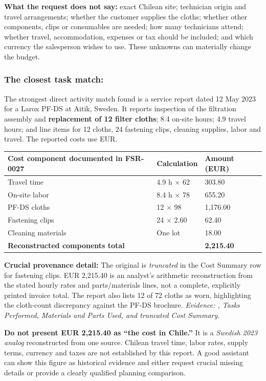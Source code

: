 \documentclass[11pt,a4paper]{article}
\DeclareRobustCommand{\code}[1]{{\ttfamily\small\detokenize{#1}}}
\newcommand{\source}[1]{{\footnotesize\color{Gray}\textit{Evidence: #1}}}
\newcommand{\term}[1]{\textbf{#1}}
\begin{document}
\textbf{What the request does not say:} exact Chilean site; technician origin and travel arrangements; whether the customer supplies the cloths; whether other components, clips or consumables are needed; how many technicians attend; whether travel, accommodation, expenses or tax should be included; and which currency the salesperson wishes to use. These unknowns can materially change the budget.

\subsubsection{The closest task match: \code{FSR-0027.txt}}
The strongest direct activity match found is a service report dated 12 May 2023 for a Larox PF-DS at Aitik, Sweden. It reports inspection of the filtration assembly and \term{replacement of 12 filter cloths}; 8.4 on-site hours; 4.9 travel hours; and line items for 12 cloths, 24 fastening clips, cleaning supplies, labor and travel. The reported costs use EUR.

\begin{tabularx}{\textwidth}{@{}Y L{28mm}L{32mm}@{}}
\toprule\textbf{Cost component documented in FSR-0027} & \textbf{Calculation} & \textbf{Amount (EUR)}\\\midrule
Travel time & 4.9 h $\times$ 62 & 303.80\\
On-site labor & 8.4 h $\times$ 78 & 655.20\\
PF-DS cloths & 12 $\times$ 98 & 1,176.00\\
Fastening clips & 24 $\times$ 2.60 & 62.40\\
Cleaning materials & One lot & 18.00\\\midrule
\textbf{Reconstructed components total} & & \textbf{2,215.40}\\\bottomrule
\end{tabularx}

\textbf{Crucial provenance detail:} The original \code{FSR-0027.txt} is \emph{truncated} in the Cost Summary row for fastening clips. EUR 2,215.40 is an analyst's arithmetic reconstruction from the stated hourly rates and parts/materials lines, not a complete, explicitly printed invoice total. The report also lists 12 of 72 cloths as worn, highlighting the cloth-count discrepancy against the PF-DS brochure. \source{\code{FSR-0027.txt}, Tasks Performed, Materials and Parts Used, and truncated Cost Summary.}

\begin{warnbox}
\textbf{Do not present EUR 2,215.40 as ``the cost in Chile.''} It is a \emph{Swedish 2023 analog} reconstructed from one source. Chilean travel time, labor rates, supply terms, currency and taxes are not established by this report. A good assistant can show this figure as historical evidence and either request crucial missing details or provide a clearly qualified planning comparison.
\end{warnbox}
\end{document}
